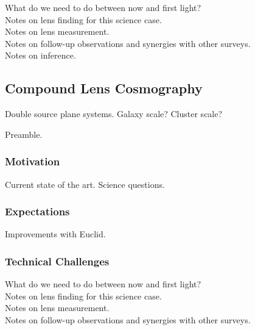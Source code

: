 \documentclass[twocolumn]{svjour3}
\begin{document}
What do we need to do between now and first light?\\

Notes on lens finding for this science case.\\

Notes on lens measurement.\\

Notes on follow-up observations and synergies with other surveys.\\

Notes on inference.\\



\subsection{Compound Lens Cosmography}



Double source plane systems. Galaxy scale? Cluster scale?


Preamble.

\subsubsection{Motivation}
Current state of the art. Science questions.\\

\subsubsection{Expectations}
Improvements with Euclid.\\

\subsubsection{Technical Challenges}

What do we need to do between now and first light?\\

Notes on lens finding for this science case.\\

Notes on lens measurement.\\

Notes on follow-up observations and synergies with other surveys.\\
\end{document}
